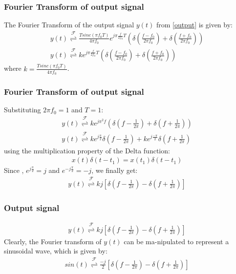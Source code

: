 \documentclass{beamer}
\providecommand{\sbrak}[1]{\ensuremath{{}\left[#1\right]}}
\providecommand{\brak}[1]{\ensuremath{\left(#1\right)}}
\providecommand{\fourier}{\overset{\mathcal{F}}{ \rightleftharpoons}}
\begin{document}
\begin{frame}
\frametitle{Fourier Transform of output signal}
The Fourier Transform of the output signal $y(t)$ from \eqref{output} is given by:
 \begin{align}
     y(t) \fourier \frac{Tsinc(\pi f_0 T)}{4\pi f_0}e^{j\pi \frac{f}{2f_0}T}\brak{\delta\brak{\frac{f - f_0}{2\pi f_0}} + \delta\brak{\frac{f + f_0}{2\pi f_0}}}\\
     y(t) \fourier ke^{j\pi \frac{f}{2f_0}T}\brak{\delta\brak{\frac{f - f_0}{2\pi f_0}} + \delta\brak{\frac{f + f_0}{2\pi f_0}}}
 \end{align}
 where $k = \frac{Tsinc(\pi f_0T)}{4\pi f_0}$.
\end{frame}
\begin{frame}
    \frametitle{Fourier Transform of output signal}
    \begin{flushleft}
    Substituting $2\pi f_0 = 1$ and $T = 1$:
 \begin{align}
     y(t) \fourier ke^{j\pi^2f}\brak{\delta\brak{f - \frac{1}{2\pi}} + \delta\brak{f + \frac{1}{2\pi}}}\\
     y(t) \fourier ke^{j\frac{\pi}{2}}\delta\brak{f - \frac{1}{2\pi}} +ke^{j\frac{-\pi}{2}}\delta\brak{f + \frac{1}{2\pi}}
 \end{align}
 using the multiplication property of the Delta function:
 \begin{align}
     x(t)\delta(t - t_1) = x(t_1)\delta(t - t_1)
 \end{align}
 Since , $e^{j\frac{\pi}{2}} = j$ and $e^{-j\frac{\pi}{2}} = -j$, we finally get:
 \begin{align}
 y(t) \fourier kj\sbrak{\delta\brak{f - \frac{1}{2\pi}} - \delta\brak{f + \frac{1}{2\pi}}}
 \end{align}
    \end{flushleft}
\end{frame}
\begin{frame}
\frametitle{Output signal}
\begin{flushleft}
\begin{align}
    y(t) \fourier kj\sbrak{\delta\brak{f - \frac{1}{2\pi}} - \delta\brak{f + \frac{1}{2\pi}}}
\end{align}
Clearly, the Fourier transform of $y(t)$ can  be  ma-nipulated  to  represent  a  sinusoidal  wave,  which  is given by:
 \begin{align}
     sin(t) \fourier \frac{-j}{2}\sbrak{\delta\brak{f-\frac{1}{2\pi}} - \delta\brak{f + \frac{1}{2\pi}}}
 \end{align}
\end{flushleft}
\end{frame}
\end{document}
